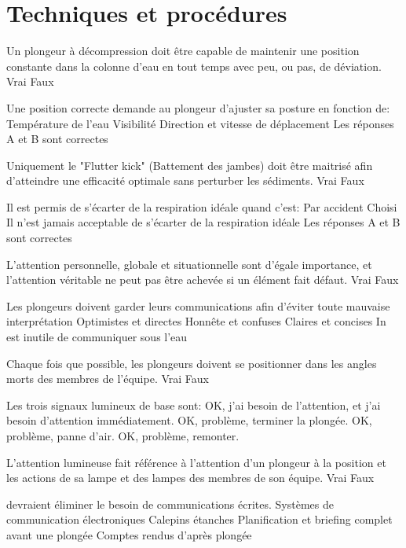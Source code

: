 \documentclass[english,12pt,a4paper]{article}
\begin{document}
	\section{Techniques et procédures}
	\begin{outline}
		\1 Un plongeur à décompression doit être capable de maintenir une position constante dans la colonne d'eau en tout temps avec peu, ou pas, de déviation.
			\2 Vrai
			\2 Faux

		\1 Une position correcte demande au plongeur d'ajuster sa posture en fonction de:
			\2 Température de l'eau
			\2 Visibilité
			\2 Direction et vitesse de déplacement
			\2 Les réponses A et B sont correctes

		\1 Uniquement le "Flutter kick" (Battement des jambes) doit être maitrisé afin d'atteindre une efficacité optimale sans perturber les sédiments.
			\2 Vrai
			\2 Faux

		\1 Il est permis de s'écarter de la respiration idéale quand c'est:
			\2 Par accident
			\2 Choisi
			\2 Il n'est jamais acceptable de s'écarter de la respiration idéale
			\2 Les réponses A et B sont correctes

		\1 L'attention personnelle, globale et situationnelle sont d'égale importance, et l'attention véritable ne peut pas être achevée si un élément fait défaut.
			\2 Vrai
			\2 Faux

		\1 Les plongeurs doivent garder leurs communications \underline{\hspace{1.5cm}} afin d'éviter toute mauvaise interprétation
			\2 Optimistes et directes
			\2 Honnête et confuses
			\2 Claires et concises
			\2 In est inutile de communiquer sous l'eau

		\1 Chaque fois que possible, les plongeurs doivent se positionner dans les angles morts des membres de l'équipe.
			\2 Vrai
			\2 Faux

		\1 Les trois signaux lumineux de base sont:
			\2 OK, j'ai besoin de l'attention, et j'ai besoin d'attention immédiatement.
			\2 OK, problème, terminer la plongée.
			\2 OK, problème, panne d'air.
			\2 OK, problème, remonter.

		\1 L'attention lumineuse fait référence à l'attention d'un plongeur à la position et les actions de sa lampe et des lampes des membres de son équipe.
			\2 Vrai
			\2 Faux

		\1 \underline{\hspace{1.5cm}} devraient éliminer le besoin de communications écrites.
			\2 Systèmes de communication électroniques
			\2 Calepins étanches
			\2 Planification et briefing complet avant une plongée
			\2 Comptes rendus d'après plongée


\end{outline}
\end{document}
